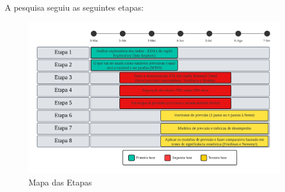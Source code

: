     
    A pesquisa seguiu as seguintes etapas:
    \begin{figure}[htpb!]
    	\centering
    	\caption{Mapa das Etapas}
    	\label{fig:etapas}
    	\includegraphics[width=1\linewidth]{Introducao/Figuras/Etapas}
    	
    \end{figure}

